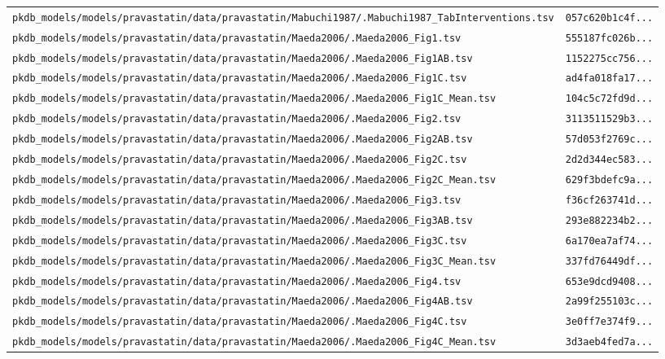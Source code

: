 \documentclass{article}
\begin{document}
\begin{longtable}{ll}
\texttt{pkdb\_models/models/pravastatin/data/pravastatin/Mabuchi1987/.Mabuchi1987\_TabInterventions.tsv} & \texttt{057c620b1c4f...} \\
\texttt{pkdb\_models/models/pravastatin/data/pravastatin/Maeda2006/.Maeda2006\_Fig1.tsv} & \texttt{555187fc026b...} \\
\texttt{pkdb\_models/models/pravastatin/data/pravastatin/Maeda2006/.Maeda2006\_Fig1AB.tsv} & \texttt{1152275cc756...} \\
\texttt{pkdb\_models/models/pravastatin/data/pravastatin/Maeda2006/.Maeda2006\_Fig1C.tsv} & \texttt{ad4fa018fa17...} \\
\texttt{pkdb\_models/models/pravastatin/data/pravastatin/Maeda2006/.Maeda2006\_Fig1C\_Mean.tsv} & \texttt{104c5c72fd9d...} \\
\texttt{pkdb\_models/models/pravastatin/data/pravastatin/Maeda2006/.Maeda2006\_Fig2.tsv} & \texttt{3113511529b3...} \\
\texttt{pkdb\_models/models/pravastatin/data/pravastatin/Maeda2006/.Maeda2006\_Fig2AB.tsv} & \texttt{57d053f2769c...} \\
\texttt{pkdb\_models/models/pravastatin/data/pravastatin/Maeda2006/.Maeda2006\_Fig2C.tsv} & \texttt{2d2d344ec583...} \\
\texttt{pkdb\_models/models/pravastatin/data/pravastatin/Maeda2006/.Maeda2006\_Fig2C\_Mean.tsv} & \texttt{629f3bdefc9a...} \\
\texttt{pkdb\_models/models/pravastatin/data/pravastatin/Maeda2006/.Maeda2006\_Fig3.tsv} & \texttt{f36cf263741d...} \\
\texttt{pkdb\_models/models/pravastatin/data/pravastatin/Maeda2006/.Maeda2006\_Fig3AB.tsv} & \texttt{293e882234b2...} \\
\texttt{pkdb\_models/models/pravastatin/data/pravastatin/Maeda2006/.Maeda2006\_Fig3C.tsv} & \texttt{6a170ea7af74...} \\
\texttt{pkdb\_models/models/pravastatin/data/pravastatin/Maeda2006/.Maeda2006\_Fig3C\_Mean.tsv} & \texttt{337fd76449df...} \\
\texttt{pkdb\_models/models/pravastatin/data/pravastatin/Maeda2006/.Maeda2006\_Fig4.tsv} & \texttt{653e9dcd9408...} \\
\texttt{pkdb\_models/models/pravastatin/data/pravastatin/Maeda2006/.Maeda2006\_Fig4AB.tsv} & \texttt{2a99f255103c...} \\
\texttt{pkdb\_models/models/pravastatin/data/pravastatin/Maeda2006/.Maeda2006\_Fig4C.tsv} & \texttt{3e0ff7e374f9...} \\
\texttt{pkdb\_models/models/pravastatin/data/pravastatin/Maeda2006/.Maeda2006\_Fig4C\_Mean.tsv} & \texttt{3d3aeb4fed7a...} \\

\end{longtable}
\end{document}

